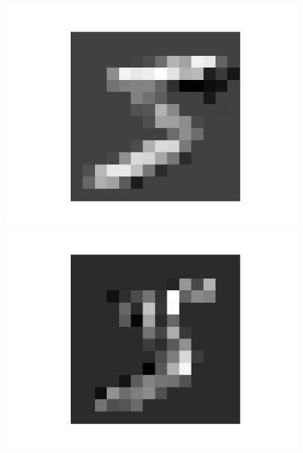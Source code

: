 \documentclass{article}
\begin{document}
\begin{figure}[h]
\begin{minipage}{0.2\linewidth}
	\includegraphics[width=\linewidth]{../graphics/mnist_5/conv_pool/lower_horiz_pooled.png}
\end{minipage}
\hfill
\begin{minipage}{0.2\linewidth}
	\centering
	\includegraphics[width=\linewidth]{../graphics/mnist_5/conv_pool/right_vert_pooled.png}
\end{minipage}
\\
	\begin{minipage}{0.2\linewidth}
	\centering

\end{minipage}
\end{figure}
\end{document}
